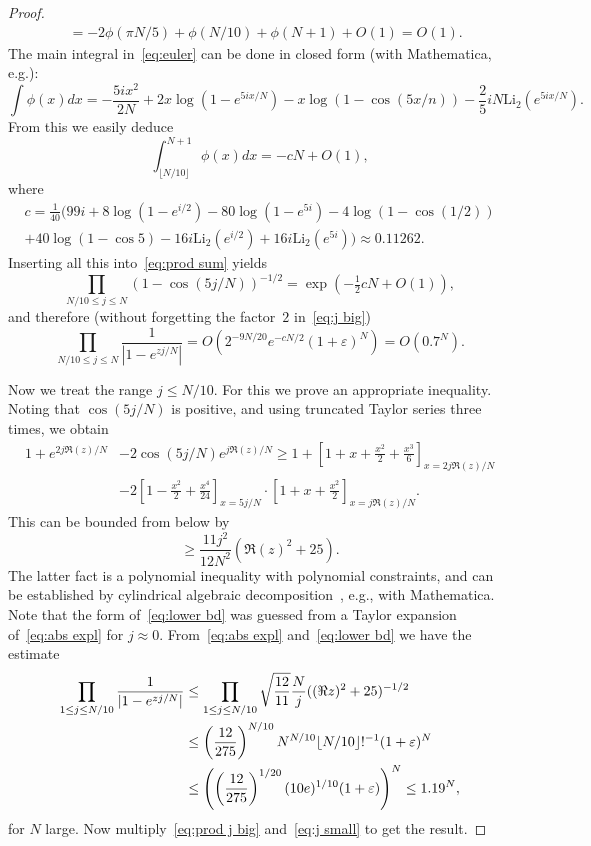 \documentclass[a4paper]{amsart}
\begin{document}
\begin{proof}
\begin{align*}
    &= -2\phi(\pi N/5)+\phi(N/10)+\phi(N+1)+O(1) = O(1).
  \end{align*}
  The main integral in~\eqref{eq:euler} can be done in closed form
  (with Mathematica, e.g.):
  \[
    \int \phi(x) dx = -\frac{5i x^2}{2N} + 2x \log(1-e^{5ix/N})
    - x \log(1-\cos(5x/n)) - \frac25 i N \mathrm{Li}_2(e^{5ix/N}).
  \]
  From this we easily deduce
  \[
     \int_{\lfloor N/10 \rfloor}^{N+1} \phi(x)dx = -c N + O(1),
  \]
  where
  \begin{multline*}
    c = \frac{1}{40}(99 i +8\log(1-e^{i/2}) -80 \log(1-e^{5i})
    -4\log(1-\cos(1/2)) \\
     + 40 \log(1-\cos 5)     -16i \mathrm{Li}_2(e^{i/2})
    +16i \mathrm{Li}_2(e^{5i})) \approx 0.11262.
  \end{multline*}
  Inserting all this into~\eqref{eq:prod sum} yields
  \[
    \prod_{N/10 \leq j\leq N}(1-\cos(5j/N))^{-1/2} = \exp(-\tfrac12 cN + O(1)),
  \]
  and therefore (without forgetting the factor~$2$ in~\eqref{eq:j big})
  \begin{equation}\label{eq:prod j big}
    \prod_{N/10 \leq j\leq N} \frac{1}{|1-e^{z j/N}|} = O(2^{-9N/20} e^{-cN/2}
    (1+\varepsilon)^N ) = O(0.7^N).
  \end{equation}
  
  Now we treat the range $j\leq N/10$. For this we prove an appropriate
  inequality. Noting that $\cos(5j/N)$ is positive, and using truncated
  Taylor series three times, we obtain
  \begin{align*}
    1+  e^{2j \Re(z)/N}& - 2\cos(5j/N)  e^{j \Re(z)/N} 
    \geq 1+\left[1+x+\frac{x^2}{2}+\frac{x^3}{6} \right]_{x=2j \Re(z)/N} \\
    &- 2\left[1-\frac{x^2}{2}+\frac{x^4}{24} \right]_{x=5j/N} \cdot
    \left[1+x+\frac{x^2}{2} \right]_{x=j \Re(z)/N}.
  \end{align*}
  This can be bounded from below by
  \begin{equation}\label{eq:lower bd}
    \geq \frac{11j^2}{12N^2}(\Re(z)^2+25).
  \end{equation}
  The latter fact is a polynomial inequality with polynomial constraints,
  and can be established by cylindrical algebraic
  decomposition~\cite{Co75}, e.g., with Mathematica.
  Note that the form of~\eqref{eq:lower bd} was guessed from a Taylor expansion
  of~\eqref{eq:abs expl}
  for $j\approx 0$. From~\eqref{eq:abs expl}
  and~\eqref{eq:lower bd} we have the estimate
  \begin{align}
    \prod_{1\leq j\leq N/10} \frac{1}{|1-e^{z j/N}|} &\leq \prod_{1\leq j\leq N/10}
      \sqrt{\frac{12}{11}} \frac{N}{j} ((\Re z)^2 +25)^{-1/2} \notag \\
    &\leq \left( \frac{12}{275} \right)^{N/10} N^{N/10} \lfloor N/10 \rfloor!^{-1}(1+\varepsilon)^N  \notag \\
    & \leq \left(
     \left(\frac{12}{275}\right)^{1/20}(10e)^{1/10}(1+\varepsilon)\right)^N
    \leq 1.19^N, \label{eq:j small}
  \end{align}
  for $N$ large.
  Now multiply~\eqref{eq:prod j big} and~\eqref{eq:j small} to
  get the result.
\end{proof}
\end{document}
